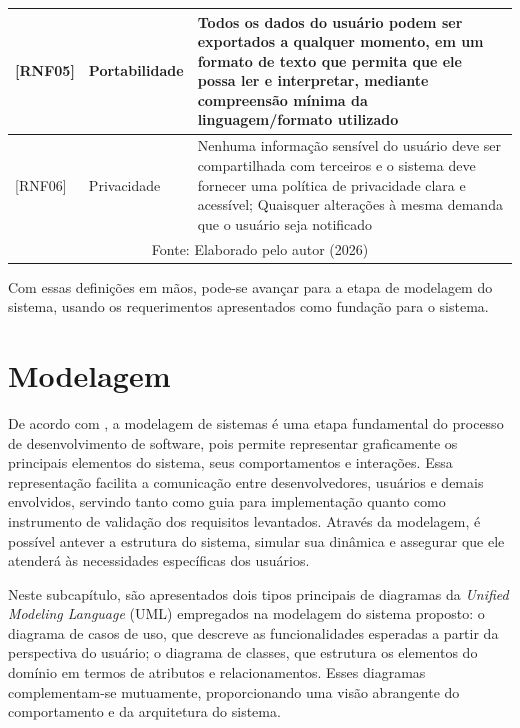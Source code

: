 \begin{longtable}{| p{} | p{} | p{} |}
        \hline

        [RNF05] &
        Portabilidade &

        Todos os dados do usuário podem ser exportados a qualquer momento, em
        um formato de texto que permita que ele possa ler e interpretar,
        mediante compreensão mínima da linguagem/formato utilizado \\

        \hline

        [RNF06] &
        Privacidade &

        Nenhuma informação sensível do usuário deve ser compartilhada com
        terceiros e o sistema deve fornecer uma política de privacidade clara e
        acessível; Quaisquer alterações à mesma demanda que o usuário seja
        notificado \\

        \hline
        \multicolumn{3}{c}{\small Fonte: Elaborado pelo autor (2026)} \\
\end{longtable}

Com essas definições em mãos, pode-se avançar para a etapa de modelagem do
sistema, usando os requerimentos apresentados como fundação para o sistema.

\section{Modelagem}

De acordo com \cite{guedes:2022}, a modelagem de sistemas é uma etapa fundamental do
processo de desenvolvimento de software, pois permite representar graficamente
os principais elementos do sistema, seus comportamentos e interações. Essa
representação facilita a comunicação entre desenvolvedores, usuários e demais
envolvidos, servindo tanto como guia para implementação quanto como instrumento
de validação dos requisitos levantados. Através da modelagem, é possível
antever a estrutura do sistema, simular sua dinâmica e assegurar que ele
atenderá às necessidades específicas dos usuários.

Neste subcapítulo, são apresentados dois tipos principais de diagramas da
\textit{Unified Modeling Language} (UML) empregados na modelagem do sistema
proposto: o diagrama de casos de uso, que descreve as funcionalidades esperadas
a partir da perspectiva do usuário; o diagrama de classes, que estrutura os
elementos do domínio em termos de atributos e relacionamentos. Esses diagramas
complementam-se mutuamente, proporcionando uma visão abrangente do
comportamento e da arquitetura do sistema.

